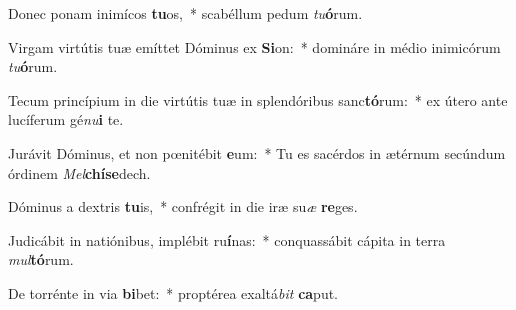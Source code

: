 \item Donec ponam inimícos \textbf{tu}os,~* scabéllum pedum \textit{tu}\textbf{ó}rum.
\item Virgam virtútis tuæ emíttet Dóminus ex \textbf{Si}on:~* domináre in médio inimicórum \textit{tu}\textbf{ó}rum.
\item Tecum princípium in die virtútis tuæ in splendóribus sanc\textbf{tó}rum:~* ex útero ante lucíferum gé\textit{nu}\textbf{i} te.
\item Jurávit Dóminus, et non pœnitébit \textbf{e}um:~* Tu es sacérdos in ætérnum secúndum órdinem \textit{Mel}\textbf{chí}\textbf{se}dech.
\item Dóminus a dextris \textbf{tu}is,~* confrégit in die iræ su\textit{æ} \textbf{re}ges.
\item Judicábit in natiónibus, implébit ru\textbf{í}nas:~* conquassábit cápita in terra \textit{mul}\textbf{tó}rum.
\item De torrénte in via \textbf{bi}bet:~* proptérea exaltá\textit{bit} \textbf{ca}put.
